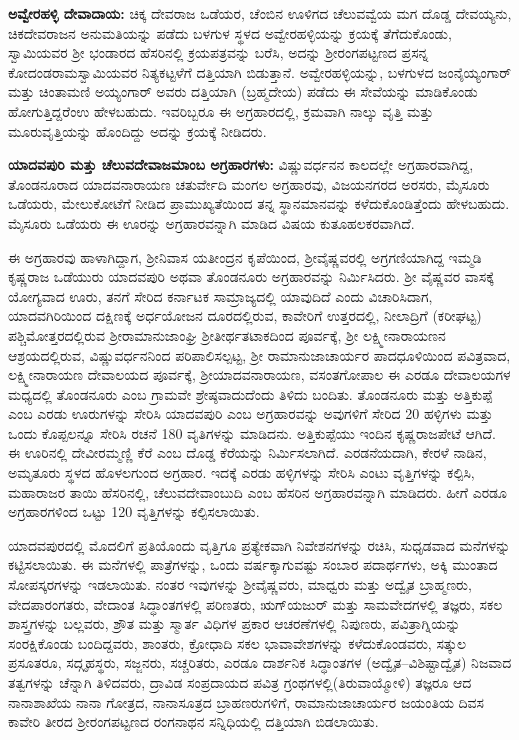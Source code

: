 \textbf{ಅವ್ವೇರಹಳ್ಳಿ ದೇವಾದಾಯ:} ಚಿಕ್ಕ ದೇವರಾಜ ಒಡೆಯರ, ಚೆಂಬಿನ ಊಳಿಗದ ಚೆಲುವವ್ವೆಯ ಮಗ ದೊಡ್ಡ ದೇವಯ್ಯನು, ಚಿಕದೇವರಾಜನ ಅನುಮತಿಯನ್ನು ಪಡೆದು ಬಳಗುಳ ಸ್ಥಳದ ಅವ್ವೇರಹಳ್ಳಿಯನ್ನು ಕ್ರಯಕ್ಕೆ ತೆಗೆದುಕೊಂಡು, ಸ್ವಾಮಿಯವರ ಶ‍್ರೀ ಭಂಡಾರದ ಹೆಸರಿನಲ್ಲಿ ಕ್ರಯಪತ್ರವನ್ನು ಬರೆಸಿ, ಅದನ್ನು ಶ‍್ರೀರಂಗಪಟ್ಟಣದ ಪ್ರಸನ್ನ ಕೋದಂಡರಾಮಸ್ವಾಮಿಯವರ ನಿತ್ಯಕಟ್ಟಳೆಗೆ ದತ್ತಿಯಾಗಿ ಬಿಡುತ್ತಾನೆ. ಅವ್ವೇರಹಳ್ಳಿಯನ್ನು, ಬಳಗುಳದ ಜಂನೈಯ್ಯಂಗಾರ್​ ಮತ್ತು ಚಿಂತಾಮಣಿ ಅಯ್ಯಂಗಾರ್​ ಅವರು ದತ್ತಿಯಾಗಿ (ಬ್ರಹ್ಮದೇಯ) ಪಡೆದು ಈ ಸೇವೆಯನ್ನು ಮಾಡಿಕೊಂಡು ಹೋಗುತ್ತಿದ್ದರೆಂಉ ಹೇಳಬಹುದು. ಇವರಿಬ್ಬರೂ ಈ ಅಗ್ರಹಾರದಲ್ಲಿ, ಕ್ರಮವಾಗಿ ನಾಲ್ಕು ವೃತ್ತಿ ಮತ್ತು ಮೂರುವೃತ್ತಿಯನ್ನು ಹೊಂದಿದ್ದು ಅದನ್ನು ಕ್ರಯಕ್ಕೆ ನೀಡಿದರು.

\textbf{ಯಾದವಪುರಿ ಮತ್ತು ಚೆಲುವದೇವಾಜಮಾಂಬ ಅಗ್ರಹಾರಗಳು:} ವಿಷ್ಣುವರ್ಧನನ ಕಾಲದಲ್ಲೇ ಅಗ್ರಹಾರವಾಗಿದ್ದ, ತೊಂಡನೂರಾದ ಯಾದವನಾರಾಯಣ ಚತುರ್ವೇದಿ ಮಂಗಲ ಅಗ್ರಹಾರವು, ವಿಜಯನಗರದ ಅರಸರು, ಮೈಸೂರು ಒಡೆಯರು, ಮೇಲುಕೋಟೆಗೆ ನೀಡಿದ ಪ್ರಾಮುಖ್ಯತೆಯಿಂದ ತನ್ನ ಸ್ಥಾನಮಾನವನ್ನು ಕಳೆದುಕೊಂಡಿತ್ತೆಂದು ಹೇಳಬಹುದು. ಮೈಸೂರು ಒಡೆಯರು ಈ ಊರನ್ನು ಅಗ್ರಹಾರವನ್ನಾಗಿ ಮಾಡಿದ ವಿಷಯ ಕುತೂಹಲಕರವಾಗಿದೆ.

ಈ ಅಗ್ರಹಾರವು ಹಾಳಾಗಿದ್ದಾಗ, ಶ‍್ರೀನಿವಾಸ ಯತೀಂದ್ರನ ಕೃಪೆಯಿಂದ, ಶ‍್ರೀವೈಷ್ಣವರಲ್ಲಿ ಅಗ್ರಗಣಿಯಾಗಿದ್ದ ಇಮ್ಮಡಿ ಕೃಷ್ಣರಾಜ ಒಡೆಯುರು ಯಾದವಪುರಿ ಅಥವಾ ತೊಂಡನೂರು ಅಗ್ರಹಾರವನ್ನು ನಿರ್ಮಿಸಿದರು. ಶ‍್ರೀ ವೈಷ್ಣವರ ವಾಸಕ್ಕೆ ಯೋಗ್ಯವಾದ ಊರು, ತನಗೆ ಸೇರಿದ ಕರ್ನಾಟಕ ಸಾಮ್ರಾಜ್ಯದಲ್ಲಿ ಯಾವುದಿದೆ ಎಂದು ವಿಚಾರಿಸಿದಾಗ, ಯಾದವಗಿರಿಯಿಂದ ದಕ್ಷಿಣಕ್ಕೆ ಅರ್ಧಯೋಜನ ದೂರದಲ್ಲಿರುವ, ಕಾವೇರಿಗೆ ಉತ್ತರದಲ್ಲಿ, ನೀಲಾದ್ರಿಗೆ (ಕರೀಘಟ್ಟ) ಪಶ್ಚಿಮೋತ್ತರದಲ್ಲಿರುವ ಶ‍್ರೀರಾಮಾನುಜಾಂಘ್ರಿ ಶ‍್ರೀತೀರ್ಥತಟಾಕದಿಂದ ಪೂರ್ವಕ್ಕೆ, ಶ‍್ರೀ ಲಕ್ಷ್ಮೀನಾರಾಯಣನ ಆಶ್ರಯದಲ್ಲಿರುವ, ವಿಷ್ಣುವರ್ಧನನಿಂದ ಪರಿಪಾಲಿಸಲ್ಪಟ್ಟ, ಶ‍್ರೀ ರಾಮಾನುಜಾಚಾರ್ಯರ ಪಾದಧೂಳಿಯಿಂದ ಪವಿತ್ರವಾದ, ಲಕ್ಷ್ಮೀನಾರಾಯಣ ದೇವಾಲಯದ ಪೂರ್ವಕ್ಕೆ, ಶ‍್ರೀಯಾದವನಾರಾಯಣ, ವಸಂತಗೋಪಾಲ ಈ ಎರಡೂ ದೇವಾಲಯಗಳ ಮಧ್ಯದಲ್ಲಿ ತೊಂಡನೂರು ಎಂಬ ಗ್ರಾಮವೇ ಶ್ರೇಷ್ಠವಾದುದೆಂದು ತಿಳಿದು ಬಂದಿತು. ತೊಂಡನೂರು ಮತ್ತು ಅತ್ತಿಕುಪ್ಪೆ ಎಂಬ ಎರಡು ಊರುಗಳನ್ನು ಸೇರಿಸಿ ಯಾದವಪುರಿ ಎಂಬ ಅಗ್ರಹಾರವನ್ನು ಅವುಗಳಿಗೆ ಸೇರಿದ 20 ಹಳ್ಳಿಗಳು ಮತ್ತು ಒಂದು ಕೊಪ್ಪಲನ್ನೂ ಸೇರಿಸಿ ರಚನೆ 180 ವೃತಿಗಳನ್ನು ಮಾಡಿದನು. ಅತ್ತಿಕುಪ್ಪೆಯು ಇಂದಿನ ಕೃಷ್ಣರಾಜಪೇಟೆ ಆಗಿದೆ. ಈ ಊರಿನಲ್ಲಿ ದೇವೀರಮ್ಮಣ್ಣಿ ಕೆರೆ ಎಂಬ ದೊಡ್ಡ ಕೆರೆಯನ್ನು ನಿರ್ಮಿಸಲಾಗಿದೆ. ಎರಡನೆಯದಾಗಿ, ಕೇರಳೆ ನಾಡಿನ, ಅಮೃತೂರು ಸ್ಥಳದ ಹೊಳಲಗುಂದ ಅಗ್ರಹಾರ. ಇದಕ್ಕೆ ಎರಡು ಹಳ್ಳಿಗಳನ್ನು ಸೇರಿಸಿ ಎಂಟು ವೃತ್ತಿಗಳನ್ನು ಕಲ್ಪಿಸಿ, ಮಹಾರಾಜರ ತಾಯಿ ಹೆಸರಿನಲ್ಲಿ, ಚೆಲುವದೇವಾಂಬುದಿ ಎಂಬ ಹೆಸರಿನ ಅಗ್ರಹಾರವನ್ನಾಗಿ ಮಾಡಿದರು. ಹೀಗೆ ಎರಡೂ ಅಗ್ರಹಾರಗಳಿಂದ ಒಟ್ಟು 120 ವೃತ್ತಿಗಳನ್ನು ಕಲ್ಪಿಸಲಾಯಿತು.

ಯಾದವಪುರದಲ್ಲಿ ಮೊದಲಿಗೆ ಪ್ರತಿಯೊಂದು ವೃತ್ತಿಗೂ ಪ್ರತ್ಯೇಕವಾಗಿ ನಿವೇಶನಗಳನ್ನು ರಚಿಸಿ, ಸುಧೃಡವಾದ ಮನೆಗಳನ್ನು ಕಟ್ಟಿಸಲಾಯಿತು. ಈ ಮನೆಗಳಲ್ಲಿ ಪಾತ್ರೆಗಳನ್ನು, ಒಂದು ವರ್ಷಕ್ಕಾಗುವಷ್ಟು ಸಂಬಾರ ಪದಾರ್ಥಗಳು, ಅಕ್ಕಿ ಮುಂತಾದ ಸೋಪಸ್ಕರಗಳನ್ನು ಇಡಲಾಯಿತು. ನಂತರ ಇವುಗಳನ್ನು ಶ‍್ರೀವೈಷ್ಣವರು, ಮಾಧ್ವರು ಮತ್ತು ಅದ್ವೈತ ಬ್ರಾಹ್ಮಣರು, ವೇದಪಾರಂಗತರು, ವೇದಾಂತ ಸಿದ್ಧಾಂತಗಳಲ್ಲಿ ಪರಿಣತರು, ಋಗ್​ಯಜುರ್​ ಮತ್ತು ಸಾಮವೇದಗಳಲ್ಲಿ ತಜ್ಞರು, ಸಕಲ ಶಾಸ್ತ್ರಗಳನ್ನು ಬಲ್ಲವರು, ಶ್ರೌತ ಮತ್ತು ಸ್ಮಾರ್ತ ವಿಧಿಗಳ ಪ್ರಕಾರ ಆಚರಣೆಗಳಲ್ಲಿ ನಿಪುಣರು, ಪವಿತ್ರಾಗ್ನಿಯನ್ನು ಸಂರಕ್ಷಿಕೊಂಡು ಬಂದಿದ್ದವರು, ಶಾಂತರು, ಕ್ರೋಧಾದಿ ಸಕಲ ಭಾವಾವೇಶಗಳನ್ನು ಕಳೆದುಕೊಂಡವರು, ಸತ್ಕುಲ ಪ್ರಸೂತರೂ, ಸದ್ಗೃಹಸ್ಥರು, ಸಜ್ಜನರು, ಸಚ್ಚರಿತರು, ಎರಡೂ ದಾರ್ಶನಿಕ ಸಿದ್ಧಾಂತಗಳ (ಅದ್ವೈತ–ವಿಶಿಷ್ಟಾದ್ವೈತ) ನಿಜವಾದ ತತ್ವಗಳನ್ನು ಚೆನ್ನಾಗಿ ತಿಳಿದವರು, ದ್ರಾವಿಡ ಸಂಪ್ರದಾಯದ ಪವಿತ್ರ ಗ್ರಂಥಗಳಲ್ಲಿ(ತಿರುವಾಯ್ಮೋಳಿ) ತಜ್ಞರೂ ಆದ ನಾನಾಶಾಖೆಯ ನಾನಾ ಗೋತ್ರದ, ನಾನಾಸೂತ್ರದ ಬ್ರಾಹಣರುಗಳಿಗೆ, ರಾಮಾನುಜಾಚಾರ್ಯರ ಜಯಂತಿಯ ದಿವಸ ಕಾವೇರಿ ತೀರದ ಶ‍್ರೀರಂಗಪಟ್ಟಣದ ರಂಗನಾಥನ ಸನ್ನಿಧಿಯಲ್ಲಿ ದತ್ತಿಯಾಗಿ ಬಿಡಲಾಯಿತು.

